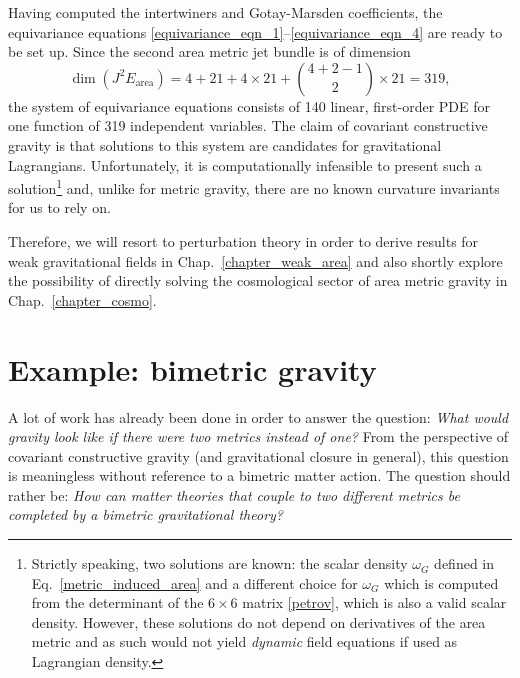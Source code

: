 Having computed the intertwiners and Gotay-Marsden coefficients, the equivariance equations \eqref{equivariance_eqn_1}--\eqref{equivariance_eqn_4} are ready to be set up. Since the second area metric jet bundle is of dimension
\begin{equation}
  \operatorname{dim}(J^2E_\text{area}) = 4 + 21 + 4\times 21 + \binom{4 + 2 - 1}{2}\times 21 = 319,
\end{equation}
the system of equivariance equations consists of 140 linear, first-order PDE for one function of 319 independent variables. The claim of covariant constructive gravity is that solutions to this system are candidates for gravitational Lagrangians. Unfortunately, it is computationally infeasible to present such a solution\footnote{Strictly speaking, two solutions are known: the scalar density $\omega_G$ defined in Eq.~\ref{metric_induced_area} and a different choice for $\omega_G$ which is computed from the determinant of the $6\times 6$ matrix \eqref{petrov}, which is also a valid scalar density. However, these solutions do not depend on derivatives of the area metric and as such would not yield \emph{dynamic} field equations if used as Lagrangian density.} and, unlike for metric gravity, there are no known curvature invariants for us to rely on.

Therefore, we will resort to perturbation theory in order to derive results for weak gravitational fields in Chap.~\ref{chapter_weak_area} and also shortly explore the possibility of directly solving the cosmological sector of area metric gravity in Chap.~\ref{chapter_cosmo}.

\section{Example: bimetric gravity}
\label{section_bimetric}

A lot of work has already been done in order to answer the question: \emph{What would gravity look like if there were two metrics instead of one?} From the perspective of covariant constructive gravity (and gravitational closure in general), this question is meaningless without reference to a bimetric matter action. The question should rather be: \emph{How can matter theories that couple to two different metrics be completed by a bimetric gravitational theory?}

